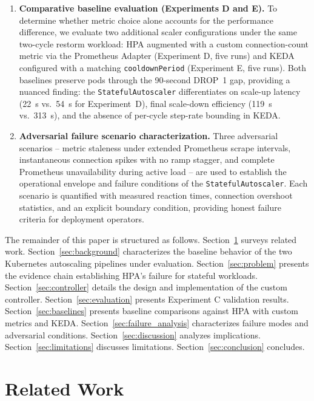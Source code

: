 \documentclass[twocolumn]{svjour3}
\begin{document}
\begin{enumerate}[leftmargin=*]
\item \textbf{Comparative baseline evaluation (Experiments D and E).} To determine whether metric choice alone accounts for the performance difference, we evaluate two additional scaler configurations under the same two-cycle restorm workload: HPA augmented with a custom connection-count metric via the Prometheus Adapter (Experiment D, five runs) and KEDA configured with a matching \texttt{cooldownPeriod} (Experiment E, five runs). Both baselines preserve pods through the 90-second DROP~1 gap, providing a nuanced finding: the \texttt{StatefulAutoscaler} differentiates on scale-up latency (22~s vs.\ 54~s for Experiment~D), final scale-down efficiency (119~s vs.\ 313~s), and the absence of per-cycle step-rate bounding in KEDA.

\item \textbf{Adversarial failure scenario characterization.} Three adversarial scenarios -- metric staleness under extended Prometheus scrape intervals, instantaneous connection spikes with no ramp stagger, and complete Prometheus unavailability during active load -- are used to establish the operational envelope and failure conditions of the \texttt{StatefulAutoscaler}. Each scenario is quantified with measured reaction times, connection overshoot statistics, and an explicit boundary condition, providing honest failure criteria for deployment operators.
\end{enumerate}

The remainder of this paper is structured as follows. Section~\ref{sec:related} surveys related work. Section~\ref{sec:background} characterizes the baseline behavior of the two Kubernetes autoscaling pipelines under evaluation. Section~\ref{sec:problem} presents the evidence chain establishing HPA's failure for stateful workloads. Section~\ref{sec:controller} details the design and implementation of the custom controller. Section~\ref{sec:evaluation} presents Experiment C validation results. Section~\ref{sec:baselines} presents baseline comparisons against HPA with custom metrics and KEDA. Section~\ref{sec:failure_analysis} characterizes failure modes and adversarial conditions. Section~\ref{sec:discussion} analyzes implications. Section~\ref{sec:limitations} discusses limitations. Section~\ref{sec:conclusion} concludes.


\section{Related Work}
\label{sec:related}
\end{document}

